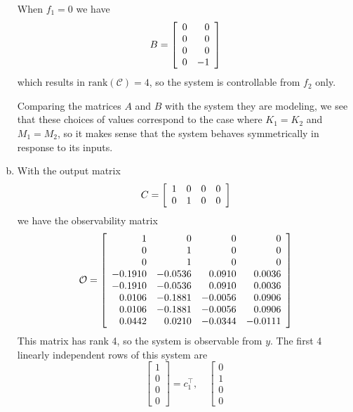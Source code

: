\documentclass{article}
\begin{document}
\begin{enumerate}[(a)]
{    When $f_1 = 0$ we have
    $$
    B =
    \left[\begin{array}{r r}
      0 &  0 \\
      0 &  0 \\
      0 &  0 \\
      0 & -1
    \end{array}\right]
    $$
    which results in $\mathrm{rank}(\mathcal{C}) = 4$,
    so the system is controllable from $f_2$ only.

    Comparing the matrices $A$ and $B$
    with the system they are modeling, we see that these choices of
    values correspond to the case where $K_1 = K_2$ and $M_1 = M_2$,
    so it makes sense that the system behaves symmetrically in
    response to its inputs.
  }
  \item{
      With the output matrix
      $$
      C = \left[\begin{array}{c c c c}
            1 & 0 & 0 & 0 \\
            0 & 1 & 0 & 0
          \end{array}\right]
      $$
      we have the observability matrix
      $$
      \mathcal{O} =
      \left[\begin{array}{r r r r}
              1 &       0 &       0 &       0 \\
              0 &       1 &       0 &       0 \\
              0 &       1 &       0 &       0 \\
        -0.1910 & -0.0536 &  0.0910 &  0.0036 \\
        -0.1910 & -0.0536 &  0.0910 &  0.0036 \\
         0.0106 & -0.1881 & -0.0056 &  0.0906 \\
         0.0106 & -0.1881 & -0.0056 &  0.0906 \\
         0.0442 &  0.0210 & -0.0344 & -0.0111
      \end{array}\right]
      $$
      This matrix has rank 4, so the system is observable from $y$.
      The first 4 linearly independent rows of this system are
      $$
      \left[\begin{array}{r}
        1 \\ 0 \\ 0 \\ 0
      \end{array}\right] = c_1^\top, \quad
      \left[\begin{array}{r}
        0 \\ 1 \\ 0 \\ 0

\end{array}$$}
\end{enumerate}
\end{document}
